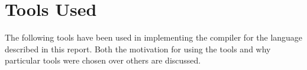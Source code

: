 \section{Tools Used}

The following tools have been used in implementing the compiler for the language described in this report. Both the motivation for using the tools and why particular tools were chosen over others are discussed.



